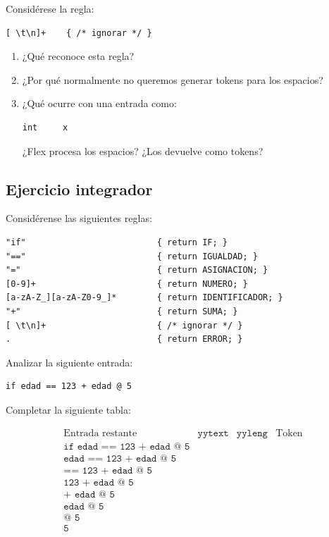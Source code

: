 \documentclass{article}
\begin{document}
Considérese la regla:

\begin{verbatim}
[ \t\n]+    { /* ignorar */ }
\end{verbatim}

\begin{enumerate}
    \item ¿Qué reconoce esta regla?

    \item ¿Por qué normalmente no queremos generar tokens para los
    espacios?

    \item ¿Qué ocurre con una entrada como:

\begin{verbatim}
int     x
\end{verbatim}

    ¿Flex procesa los espacios? ¿Los devuelve como tokens?
\end{enumerate}

\subsection{Ejercicio integrador}

Considérense las siguientes reglas:

\begin{verbatim}
"if"                          { return IF; }
"=="                          { return IGUALDAD; }
"="                           { return ASIGNACION; }
[0-9]+                        { return NUMERO; }
[a-zA-Z_][a-zA-Z0-9_]*        { return IDENTIFICADOR; }
"+"                           { return SUMA; }
[ \t\n]+                      { /* ignorar */ }
.                             { return ERROR; }
\end{verbatim}

Analizar la siguiente entrada:

\begin{verbatim}
if edad == 123 + edad @ 5
\end{verbatim}

Completar la siguiente tabla:

\[
\begin{array}{c|c|c|c}
\text{Entrada restante} & \texttt{yytext} &
\texttt{yyleng} & \text{Token} \\
\hline
\texttt{if edad == 123 + edad @ 5} & & & \\
\texttt{edad == 123 + edad @ 5} & & & \\
\texttt{== 123 + edad @ 5} & & & \\
\texttt{123 + edad @ 5} & & & \\
\texttt{+ edad @ 5} & & & \\
\texttt{edad @ 5} & & & \\
\texttt{@ 5} & & & \\
\texttt{5} & & &
\end{array}
\]
\end{document}
